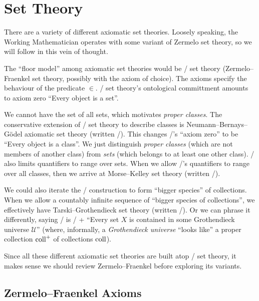 
\chapter{Set Theory}

\begin{remark}
There are a variety of different axiomatic set theories. Loosely
speaking, the Working Mathematician operates with some variant of
Zermelo set theory, so we will follow in this vein of thought.

The ``floor model'' among axiomatic set theories would be \ZFpmC/ set
theory (Zermelo--Fraenkel set theory, possibly with the axiom of
choice). The axioms specify the behaviour of the predicate $\in$. \ZF/
set theory's ontological committment amounts to axiom zero ``Every
object is a set''.

We cannot have the set of all sets, which motivates \emph{proper classes}.
The conservative extension of \ZF/ set theory to describe classes is
Neumann--Bernays--G\"{o}del axiomatic set theory (written \NBG/). This
changes \ZF/'s ``axiom zero'' to be ``Every object is a class''. We
just distinguish \emph{proper classes} (which are not members of
another class) from \emph{sets} (which belongs to at least one other class).
\NBG/ also limits quantifiers to range over sets. When we allow
\NBG/'s quantifiers to range over all classes, then we arrive at
Morse--Kelley set theory (written \MK/).

We could also iterate the \NBG/ construction to form ``bigger
species'' of collections. When we allow a countably infinite sequence
of ``bigger species of collections'', we effectively have
Tarski--Grothendieck set theory (written \TG/). Or we can phrase it
differently, saying \TG/ is \ZF/ + ``Every set $X$ is contained in
some Grothendieck universe $\mathcal{U}$'' (where, informally, a
\emph{Grothendieck universe} ``looks like'' a proper collection $\hbox{coll}^{+}$
of collections $\hbox{coll}$). 

Since all these different axiomatic set theories are built atop \ZF/
set theory, it makes sense we should review Zermelo--Fraenkel before
exploring its variants.
\end{remark}

\section{Zermelo--Fraenkel Axioms}

